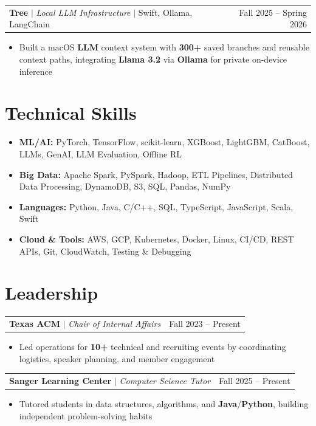 \documentclass[letterpaper,10pt]{article}
\makeatletter
\newcommand{\resumeWorkHeading}[2]{%
  \vspace{2pt}\noindent
  \begin{tabular*}{\textwidth}{@{}l@{\extracolsep{\fill}}r@{}}
    #1 & #2 \\
  \end{tabular*}%
  \vspace{-2pt}
}
\newcommand{\resumeItemListStart}{\begin{itemize}}
\newcommand{\resumeItemListEnd}{\end{itemize}\vspace{3pt}}
\newcommand{\resumeItem}[1]{\item #1}
\makeatother
\begin{document}
\resumeWorkHeading
{\textbf{Tree} $|$ \emph{Local LLM Infrastructure} $|$ Swift, Ollama, LangChain}{Fall 2025 -- Spring 2026}
\resumeItemListStart
\resumeItem{Built a macOS \textbf{LLM} context system with \textbf{300+} saved branches and reusable context paths, integrating \textbf{Llama 3.2} via \textbf{Ollama} for private on-device inference}
\resumeItemListEnd

\section{Technical Skills}
\begin{itemize}[leftmargin=0em,label={},itemsep=1pt,parsep=0pt,topsep=2pt]
\item \textbf{ML/AI:} PyTorch, TensorFlow, scikit-learn, XGBoost, LightGBM, CatBoost, LLMs, GenAI, LLM Evaluation, Offline RL
\item \textbf{Big Data:} Apache Spark, PySpark, Hadoop, ETL Pipelines, Distributed Data Processing, DynamoDB, S3, SQL, Pandas, NumPy
\item \textbf{Languages:} Python, Java, C/C++, SQL, TypeScript, JavaScript, Scala, Swift
\item \textbf{Cloud \& Tools:} AWS, GCP, Kubernetes, Docker, Linux, CI/CD, REST APIs, Git, CloudWatch, Testing \& Debugging
\end{itemize}

\section{Leadership}
\resumeWorkHeading
{\textbf{Texas ACM} $|$ \emph{Chair of Internal Affairs}}{Fall 2023 -- Present}
\resumeItemListStart
\resumeItem{Led operations for \textbf{10+} technical and recruiting events by coordinating logistics, speaker planning, and member engagement}
\resumeItemListEnd

\resumeWorkHeading
{\textbf{Sanger Learning Center} $|$ \emph{Computer Science Tutor}}{Fall 2025 -- Present}
\resumeItemListStart
\resumeItem{Tutored students in data structures, algorithms, and \textbf{Java}/\textbf{Python}, building independent problem-solving habits}
\resumeItemListEnd
\end{document}
